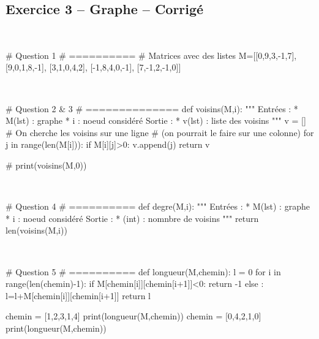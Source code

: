 \documentclass[10pt,fleqn]{article} %
\begin{document}
\begin{multicols}{2}
\newpage

\subsection*{Exercice 3 -- Graphe -- Corrigé}

\begin{corrige}
$\quad$
\begin{python}
# Question 1
# ==========
# Matrices avec des listes
M=[[0,9,3,-1,7],
      [9,0,1,8,-1],
      [3,1,0,4,2],
      [-1,8,4,0,-1],
      [7,-1,2,-1,0]]
\end{python}
\end{corrige}

\begin{corrige}
$\quad$
\begin{python}
# Question 2 & 3
# ==============
def voisins(M,i):
    """
    Entrées : 
      * M(lst) : graphe
      * i : noeud considéré
    Sortie :
      * v(lst) : liste des voisins
    """
    v = []
    # On cherche les voisins sur une ligne 
    # (on pourrait le faire sur une colonne)
    for j in range(len(M[i])):
        if M[i][j]>0:
            v.append(j)
    return v
    
# print(voisins(M,0))
\end{python}
\end{corrige}


\begin{corrige}
$\quad$
\begin{python}
# Question 4
# ==========
def degre(M,i):
    """
    Entrées : 
      * M(lst) : graphe
      * i : noeud considéré
    Sortie :
      * (int) : nomnbre de voisins
    """
    return len(voisins(M,i))
\end{python}
\end{corrige}

\begin{corrige}
$\quad$
\begin{python}
# Question 5
# ==========
def longueur(M,chemin):
    l = 0
    for i in range(len(chemin)-1):
        if M[chemin[i]][chemin[i+1]]<0:
            return -1
        else :
            l=l+M[chemin[i]][chemin[i+1]]
    return l
    
chemin = [1,2,3,1,4]
print(longueur(M,chemin))        
chemin = [0,4,2,1,0]
print(longueur(M,chemin))
\end{python}
\end{corrige}


\end{multicols}
\end{document}
